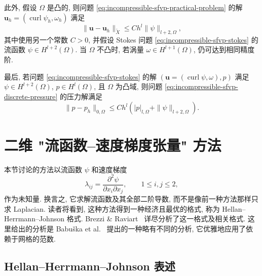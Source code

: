 此外, 假设 $\Omega$ 是凸的, 则问题
\eqref{eq:incompressible-sfvp-practical-problem} 的解
$\mathbf u_h=(\operatorname{curl}\psi_h,\omega_h)$ 满足
\begin{equation}\label{eq:incompressible-quadrilateral-velocity-superconvergence}
\|\mathbf u-\mathbf u_h\|_{\widetilde X}
\leq Ch^l\|\psi\|_{l+2,\Omega},
\end{equation}
其中使用另一个常数 $C>0$, 并假设 Stokes 问题
\eqref{eq:incompressible-sfvp-stokes} 的流函数
$\psi\in H^{l+2}(\Omega)$.
当 $\Omega$ 不凸时, 若涡量
$\omega\in H^{l+1}(\Omega)$, 仍可达到相同精度阶.

最后, 若问题 \eqref{eq:incompressible-sfvp-stokes}
的解 $(\mathbf u=(\operatorname{curl}\psi,\omega),p)$ 满足
$\psi\in H^{l+2}(\Omega)$, $p\in H^l(\Omega)$,
且 $\Omega$ 为凸域, 则问题
\eqref{eq:incompressible-sfvp-discrete-pressure} 的压力解满足
\begin{equation}\label{eq:incompressible-quadrilateral-pressure-superconvergence}
\|p-p_h\|_{0,\Omega}
\leq Ch^l\left(|p|_{l,\Omega}+\|\psi\|_{l+2,\Omega}\right).
\end{equation}

\section{二维 "流函数--速度梯度张量" 方法}
\label{sec:incompressible-stream-gradient-tensor}

本节讨论的方法以流函数 $\psi$ 和速度梯度
\[
\lambda_{ij}=\frac{\partial^2\psi}{\partial x_i\partial x_j},
\qquad1\leq i,j\leq2,
\]
作为未知量. 换言之, 它求解流函数及其全部二阶导数,
而不是像前一种方法那样只求 Laplacian.
读者将看到, 这种方法得到一种经济且最优的格式,
称为 Hellan--Herrmann--Johnson 格式.
Brezzi \& Raviart~\cite{ref:brezzi-raviart-15}
详尽分析了这一格式及相关格式.
这里给出的分析是 Babuška et al.~\cite{ref:babuska-osborn-pitkaranta-5}
提出的一种略有不同的分析, 它优雅地应用了依赖于网格的范数.

\subsection{Hellan--Herrmann--Johnson 表述}
\label{subsec:incompressible-hhj-formulation}

